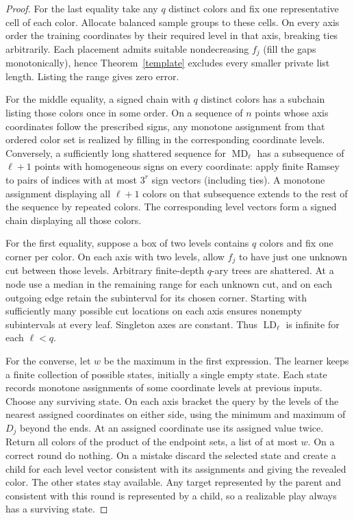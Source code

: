 \documentclass[11pt]{article}
\newcommand{\LD}{\operatorname{LD}}
\newcommand{\MD}{\operatorname{MD}}
\begin{document}
\begin{proof}
For the last equality take any $q$ distinct colors and fix one representative cell of each color. Allocate balanced sample groups to these cells. On every axis order the training coordinates by their required level in that axis, breaking ties arbitrarily. Each placement admits suitable nondecreasing $f_j$ (fill the gaps monotonically), hence Theorem~\ref{template} excludes every smaller private list length. Listing the range gives zero error.

For the middle equality, a signed chain with $q$ distinct colors has a subchain listing those colors once in some order. On a sequence of $n$ points whose axis coordinates follow the prescribed signs, any monotone assignment from that ordered color set is realized by filling in the corresponding coordinate levels. Conversely, a sufficiently long shattered sequence for $\MD_\ell$ has a subsequence of $\ell+1$ points with homogeneous signs on every coordinate: apply finite Ramsey to pairs of indices with at most $3^r$ sign vectors (including ties). A monotone assignment displaying all $\ell+1$ colors on that subsequence extends to the rest of the sequence by repeated colors. The corresponding level vectors form a signed chain displaying all those colors.

For the first equality, suppose a box of two levels contains $q$ colors and fix one corner per color. On each axis with two levels, allow $f_j$ to have just one unknown cut between those levels. Arbitrary finite-depth $q$-ary trees are shattered. At a node use a median in the remaining range for each unknown cut, and on each outgoing edge retain the subinterval for its chosen corner. Starting with sufficiently many possible cut locations on each axis ensures nonempty subintervals at every leaf. Singleton axes are constant. Thus $\LD_\ell$ is infinite for each $\ell<q$.

For the converse, let $w$ be the maximum in the first expression. The learner keeps a finite collection of possible states, initially a single empty state. Each state records monotone assignments of some coordinate levels at previous inputs. Choose any surviving state. On each axis bracket the query by the levels of the nearest assigned coordinates on either side, using the minimum and maximum of $D_j$ beyond the ends. At an assigned coordinate use its assigned value twice. Return all colors of the product of the endpoint sets, a list of at most $w$. On a correct round do nothing. On a mistake discard the selected state and create a child for each level vector consistent with its assignments and giving the revealed color. The other states stay available. Any target represented by the parent and consistent with this round is represented by a child, so a realizable play always has a surviving state.


\end{proof}
\end{document}
